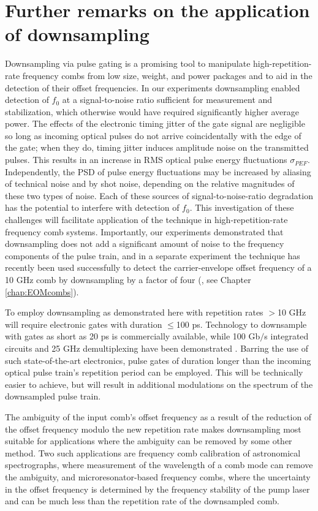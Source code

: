 \section{Further remarks on the application of downsampling}\label{sec:PPConclusion}
Downsampling via pulse gating is a promising tool to manipulate high-repetition-rate frequency combs from low size, weight, and power packages and to aid in the detection of their offset frequencies. In our experiments downsampling enabled detection of $f_0$ at a signal-to-noise ratio sufficient for measurement and stabilization, which otherwise would have required significantly higher average power. The effects of the electronic timing jitter of the gate signal are negligible so long as incoming optical pulses do not arrive coincidentally with the edge of the gate; when they do, timing jitter induces amplitude noise on the transmitted pulses. This results in an increase in RMS optical pulse energy fluctuations $\sigma_{PEF}$. Independently, the PSD of pulse energy fluctuations may be increased by aliasing of technical noise and by shot noise, depending on the relative magnitudes of these two types of noise. Each of these sources of signal-to-noise-ratio degradation has the potential to interfere with detection of $f_0$. This investigation of these challenges will facilitate application of the technique in high-repetition-rate frequency comb systems. Importantly, our experiments demonstrated that downsampling does not add a significant amount of noise to the frequency components of the pulse train, and in a separate experiment the technique has recently been used successfully to detect the carrier-envelope offset frequency of a 10 GHz comb by downsampling by a factor of four (\cite{Beha2017}, see Chapter \ref{chap:EOMcombs}).

To employ downsampling as demonstrated here with repetition rates $>$10 GHz will require electronic gates with duration $\leq$100 ps. Technology to downsample with gates as short as 20 ps is commercially available, while 100 Gb$/$s integrated circuits and 25 GHz demultiplexing have been demonstrated \cite{Driad2011,Ferenci2012}. Barring the use of such state-of-the-art electronics, pulse gates of duration longer than the incoming optical pulse train's repetition period can be employed.  This will be technically easier to achieve, but will result in additional modulations on the spectrum of the downsampled pulse train.

The ambiguity of the input comb's offset frequency as a result of the reduction of the offset frequency modulo the new repetition rate makes downsampling most suitable for applications where the ambiguity can be removed by some other method.  Two such applications are frequency comb calibration of astronomical spectrographs, where measurement of the wavelength of a comb mode can remove the ambiguity, and microresonator-based frequency combs, where the uncertainty in the offset frequency is determined by the frequency stability of the pump laser and can be much less than the repetition rate of the downsampled comb. 



